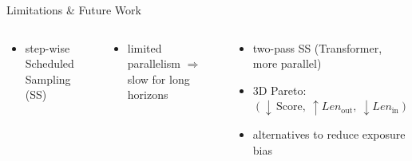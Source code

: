 \begin{frame}{Limitations \& Future Work}
\vspace{0.4em}

\begin{columns}[c,onlytextwidth]


  \begin{tcolorbox}[
    colback=gray!12,
    colframe=gray!50,
    fonttitle=\small\bfseries,
    title={Today},
    arc=5pt, boxrule=0.7pt,
    left=5pt, right=5pt, top=3pt, bottom=4pt
  ]
  {\small
  \begin{itemize}[leftmargin=1.2em, itemsep=4pt, topsep=2pt, label=\textbullet]
    \item step-wise Scheduled Sampling (SS)
  \end{itemize}
  }
  \end{tcolorbox}

  \vspace{0.7em}

  \begin{tcolorbox}[
    colback=orange!10,
    colframe=orange!65,
    fonttitle=\small\bfseries,
    title={Limitation},
    arc=5pt, boxrule=0.7pt,
    left=5pt, right=5pt, top=3pt, bottom=4pt
  ]
  {\small
  \begin{itemize}[leftmargin=1.2em, itemsep=4pt, topsep=2pt, label=\textbullet]
    \item limited parallelism $\Rightarrow$ slow for long horizons
  \end{itemize}
  }
  \end{tcolorbox}

  \centering{\large $\longrightarrow$}


  \begin{tcolorbox}[
    colback=blue!7,
    colframe=blue!45,
    fonttitle=\small\bfseries,
    title={Future Work},
    arc=5pt, boxrule=0.7pt,
    left=5pt, right=5pt, top=3pt, bottom=5pt
  ]
  {\small
  \begin{itemize}[leftmargin=1.2em, itemsep=4pt, topsep=2pt, label=\textbullet]
    \item two-pass SS (Transformer, more parallel)
    \item 3D Pareto: $(\downarrow\,\mathrm{Score},\ \uparrow Len_{\text{out}},\ \downarrow Len_{\text{in}})$
    \item alternatives to reduce exposure bias
  \end{itemize}
  }
  \end{tcolorbox}

\end{columns}
\end{frame}